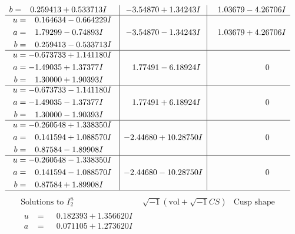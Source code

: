 \documentclass[1p]{elsarticle_modified}
\theoremstyle{definition}
\newcommand{\I}{\sqrt{-1}}
\begin{document}
$$\begin{array}{c|c|c}
\begin{aligned}
b &= \phantom{-}0.259413 + 0.533713 I\end{aligned}
 & -3.54870 + 1.34243 I & \phantom{-}1.03679 - 4.26706 I \\ \hline\begin{aligned}
u &= \phantom{-}0.164634 - 0.664229 I \\
a &= \phantom{-}1.79299 - 0.74893 I \\
b &= \phantom{-}0.259413 - 0.533713 I\end{aligned}
 & -3.54870 - 1.34243 I & \phantom{-}1.03679 + 4.26706 I \\ \hline\begin{aligned}
u &= -0.673733 + 1.141180 I \\
a &= -1.49035 + 1.37377 I \\
b &= \phantom{-}1.30000 + 1.90393 I\end{aligned}
 & \phantom{-}1.77491 - 6.18924 I & \phantom{-0.000000 } 0 \\ \hline\begin{aligned}
u &= -0.673733 - 1.141180 I \\
a &= -1.49035 - 1.37377 I \\
b &= \phantom{-}1.30000 - 1.90393 I\end{aligned}
 & \phantom{-}1.77491 + 6.18924 I & \phantom{-0.000000 } 0 \\ \hline\begin{aligned}
u &= -0.260548 + 1.338350 I \\
a &= \phantom{-}0.141594 + 1.088570 I \\
b &= \phantom{-}0.87584 - 1.89908 I\end{aligned}
 & -2.44680 + 10.28750 I & \phantom{-0.000000 } 0 \\ \hline\begin{aligned}
u &= -0.260548 - 1.338350 I \\
a &= \phantom{-}0.141594 - 1.088570 I \\
b &= \phantom{-}0.87584 + 1.89908 I\end{aligned}
 & -2.44680 - 10.28750 I & \phantom{-0.000000 } 0\\
 \hline 
 \end{array}$$\newpage$$\begin{array}{c|c|c}  
\text{Solutions to }I^u_{2}& \I (\text{vol} + \sqrt{-1}CS) & \text{Cusp shape}\\
 \hline 
\begin{aligned}
u &= \phantom{-}0.182393 + 1.356620 I \\
a &= \phantom{-}0.071105 + 1.273620 I \\

\end{aligned}
\end{array}$$
\end{document}
